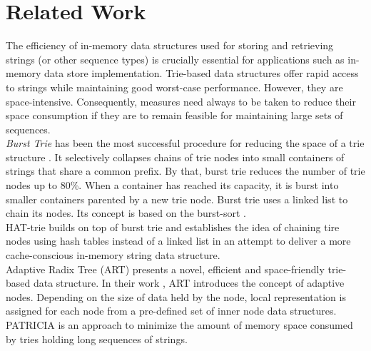 \chapter{Related Work}
\label{ch:relatedword}

The efficiency of in-memory data structures used for storing and retrieving strings (or other sequence types) is crucially essential for applications such as in-memory data store implementation. 
Trie-based data structures offer rapid access to strings while
maintaining good worst-case performance. However, they are space-intensive. Consequently, measures need always to be taken to reduce their space consumption if they are to remain feasible for maintaining large sets of sequences. \\

\textit{Burst Trie} has been the most successful procedure for reducing the space of a trie structure \cite{bursttrie}. It selectively collapses chains of trie nodes into small containers of strings that share a common prefix. By that, burst trie reduces the number of trie nodes up to 80\%. When a container has reached its capacity, it is burst into smaller containers parented by a new trie node. Burst trie uses a linked list to chain its nodes. Its concept is based on the burst-sort \cite{burstsort}. \\

HAT-trie \cite{HATTRIE} builds on top of burst trie and establishes the idea of chaining tire nodes using hash tables instead of a linked list in an attempt to deliver a more cache-conscious in-memory string data structure. \\

Adaptive Radix Tree (ART) \cite{ART} presents a novel, efficient and space-friendly trie-based data structure. In their work \cite{ART}, ART introduces the concept of adaptive nodes. Depending on the size of data held by the node, local representation is assigned for each node from a pre-defined set of inner node data structures. \\

PATRICIA \cite{PATRICIA} is an approach to minimize the amount of memory space consumed by tries holding long sequences of strings. \\	